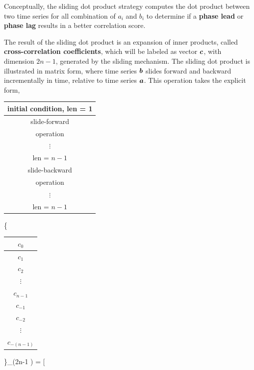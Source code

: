 Conceptually, the sliding dot product strategy computes 
the dot product
between two time series for all combination of 
$a_i$ and $b_i$ to determine
if a {\bf phase lead} or 
{\bf phase lag} results in a better correlation score.

The result of the sliding dot product is an expansion 
of inner products, 
called {\bf cross-correlation coefficients}, which 
will be labeled as 
vector $\mbox{\boldmath $c$}$, with dimension $2n-1$, generated by the sliding 
mechanism. The sliding dot product is illustrated 
in matrix form, where time series
$\mbox{\boldmath $b$}$ slides forward and backward incrementally in time, 
relative to time 
series $\mbox{\boldmath $a$}$.
This operation takes the explicit form,
\be
\begin{tabular}{c}
initial condition, len = 1 \\
\hline
slide-forward \\
operation \\ 
$\vdots$ \\
len = $n-1$\\
\hline
slide-backward \\ 
operation \\
$\vdots$ \\
len = $n-1$
\end{tabular}
\hspace{0.5cm}
%
\left\{
\begin{tabular}{c}
$c_0$ \\
\hline
$c_1$ \\
$c_2$ \\ 
$\vdots$ \\
$c_{n-1}$ \\
\hline
$c_{-1}$ \\
$c_{-2}$ \\
$\vdots$ \\
$c_{-(n-1)}$ 
\end{tabular}
\right\}_{(2n-1 )}
= \nonumber
\ee 
\be
\left[
